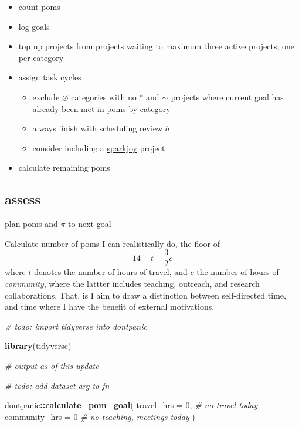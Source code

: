 \documentclass[]{book}
\newenvironment{Shaded}{\begin{snugshade}}{\end{snugshade}}
\newcommand{\CommentTok}[1]{\textcolor[rgb]{0.56,0.35,0.01}{\textit{#1}}}
\newcommand{\DataTypeTok}[1]{\textcolor[rgb]{0.13,0.29,0.53}{#1}}
\newcommand{\DecValTok}[1]{\textcolor[rgb]{0.00,0.00,0.81}{#1}}
\newcommand{\KeywordTok}[1]{\textcolor[rgb]{0.13,0.29,0.53}{\textbf{#1}}}
\newcommand{\NormalTok}[1]{#1}
\newcommand{\OperatorTok}[1]{\textcolor[rgb]{0.81,0.36,0.00}{\textbf{#1}}}
\providecommand{\tightlist}{%
  \setlength{\itemsep}{0pt}\setlength{\parskip}{0pt}}
\begin{document}
\begin{itemize}
\tightlist
\item
  count poms
\item
  log goals
\item
  top up projects from \protect\hyperlink{projects-waiting}{projects waiting} to maximum three active projects, one per category
\item
  assign task cycles

  \begin{itemize}
  \tightlist
  \item
    exclude \(\varnothing\) categories with no \(*\) and \(\sim\) projects where current goal has already been met in poms by category
  \item
    always finish with scheduling review \(\overline o\)
  \item
    consider including a \href{https://en.wikipedia.org/wiki/Marie_Kondo}{sparkjoy} project
  \end{itemize}
\item
  calculate remaining poms
\end{itemize}

\hypertarget{assess}{%
\subsection{assess}\label{assess}}

plan poms and \(\pi\) to next goal

Calculate number of poms I can realistically do, the floor of
\[
14 - t - \frac 3 2 c
\]
where \(t\) denotes the number of hours of travel, and \(c\) the number of hours of \emph{community}, where the lattter includes teaching, outreach, and research collaborations. That, is I aim to draw a distinction between self-directed time, and time where I have the benefit of external motivations.

\begin{Shaded}
\begin{Highlighting}[]
\CommentTok{# todo: import tidyverse into dontpanic}

\KeywordTok{library}\NormalTok{(tidyverse)}

\CommentTok{# output as of this update}

\CommentTok{# todo: add dataset arg to fn}

\NormalTok{dontpanic}\OperatorTok{::}\KeywordTok{calculate_pom_goal}\NormalTok{(}
  \DataTypeTok{travel_hrs =} \DecValTok{0}\NormalTok{, }\CommentTok{# no travel today}
  \DataTypeTok{community_hrs =} \DecValTok{0} \CommentTok{# no teaching, meetings today}
\NormalTok{)}
\end{Highlighting}
\end{Shaded}
\end{document}
